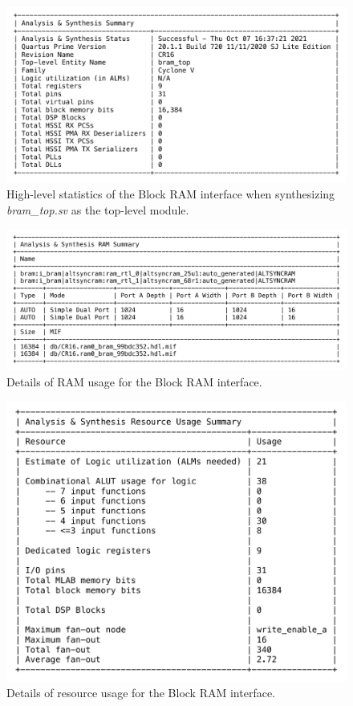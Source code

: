 \documentclass[conference]{IEEEtran}
\begin{document}
\begin{figure}[htbp]
    \centering
    \includegraphics[scale=0.42]{resources/figures/summary_analysis_synthesis.pdf}
    \caption{High-level statistics of the Block RAM interface when synthesizing \emph{bram\_top.sv} as the top-level module.}
    \label{fig:summary_analysis_synthesis}
\end{figure}

\begin{figure}[htbp]
    \centering
    \includegraphics[scale=0.42]{resources/figures/summary_ram.pdf}
    \caption{Details of RAM usage for the Block RAM interface.}
    \label{fig:summary_ram}
\end{figure}

\begin{figure}[htbp]
    \centering
    \includegraphics[scale=0.42]{resources/figures/summary_resource_usage.pdf}
    \caption{Details of resource usage for the Block RAM interface.}
    \label{fig:summary_resource_usage}
\end{figure}
\end{document}
